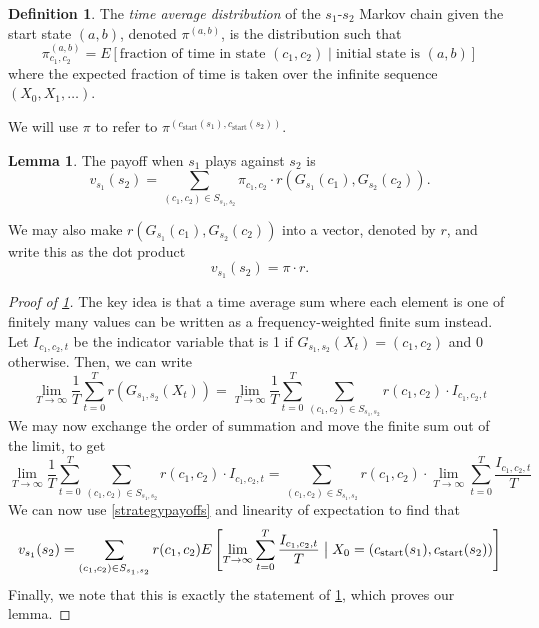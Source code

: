 \documentclass[11pt]{amsart}
\theoremstyle{definition}
\newtheorem{definition}{Definition}
\newtheorem{lemma}{Lemma}
\theoremstyle{remark}
\begin{document}
\begin{definition}
  \label{timeaveragedistribution}
  The \textit{time average distribution} of the $s_1$-$s_2$ Markov chain given the start state $(a, b)$, denoted $\pi^{(a, b)}$, is the distribution such that \begin{equation*}
    \pi_{c_1, c_2}^{(a, b)} = E \left[ \text{fraction of time in state $(c_1,c_2)$} \mid \text{initial state is } (a, b)  \right]
  \end{equation*}
  where the expected fraction of time is taken over the infinite sequence $(X_0, X_1, \ldots)$.
\end{definition}

We will use $\pi$ to refer to $\pi^{(c_{\text{start}}(s_1), c_\text{start}(s_2))}$.

\begin{lemma}
  \label{payofftimeaverage}
  The payoff when $s_1$ plays against $s_2$ is
  \begin{equation*}
    v_{s_1}(s_2) = \sum_{(c_1,c_2) \in S_{s_1,s_2}} \pi_{c_1,c_2} \cdot r(G_{s_1}(c_1),G_{s_2}(c_2)).
  \end{equation*}
\end{lemma}

We may also make $r(G_{s_1}(c_1),G_{s_2}(c_2))$ into a vector, denoted by $r$, and write this as the dot product \begin{equation*}
  v_{s_1}(s_2) = \pi \cdot r.
\end{equation*}

\begin{proof}[Proof of \cref{payofftimeaverage}]
  The key idea is that a time average sum where each element is one of finitely many values can be written as a frequency-weighted finite sum instead. Let $I_{c_1,c_2,t}$ be the indicator variable that is 1 if $G_{s_1,s_2}(X_t) = (c_1,c_2)$ and 0 otherwise.  Then, we can write \begin{equation*}
    \lim_{T \to \infty} \frac{1}{T} \sum_{t = 0}^T r(G_{s_1,s_2}(X_t)) = 
    \lim_{T \to \infty}\frac{1}{T} \sum_{t = 0}^T \sum_{(c_1,c_2) \in S_{s_1,s_2}} r(c_1,c_2) \cdot I_{c_1,c_2,t}
  \end{equation*}
  We may now exchange the order of summation and move the finite sum out of the limit, to get \begin{equation*}
    \lim_{T \to \infty}\frac{1}{T} \sum_{t = 0}^T \sum_{(c_1,c_2) \in S_{s_1,s_2}} r(c_1,c_2) \cdot I_{c_1,c_2,t}
    = \sum_{(c_1,c_2) \in S_{s_1,s_2}} r(c_1,c_2) \cdot \lim_{T \to \infty} \sum_{t=0}^T \frac{I_{c_1,c_2,t} }{T}
  \end{equation*}
  We can now use \cref{strategypayoffs} and linearity of expectation to find that
  \begin{equation*}
    v_{s_1}(s_2) = \sum_{(c_1,c_2) \in S_{s_1,s_2}} r(c_1, c_2) E \left[ \lim_{T \to \infty} \sum_{t=0}^T \frac{I_{c_1,c_2,t}}{T} \bigm| X_0 = (c_{\text{start}}(s_1), c_{\text{start}}(s_2))
    \right]
  \end{equation*}
  Finally, we note that this is exactly the statement of \cref{payofftimeaverage}, which proves our lemma.
\end{proof}
\end{document}
